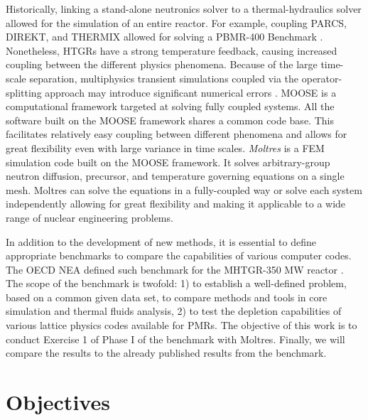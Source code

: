 \documentclass[11pt,letterpaper]{article}
\begin{document}
Historically, linking a stand-alone neutronics solver to a thermal-hydraulics solver allowed for the simulation of an entire reactor.
For example, coupling PARCS, DIREKT, and THERMIX \cite{seker_analysis_2006} allowed for solving a \gls{PBMR}-400 Benchmark \cite{reitsma_oecdneansc_2006}.
Nonetheless, \glspl{HTGR} have a strong temperature feedback, causing increased coupling between the different physics phenomena.
Because of the large time-scale separation, multiphysics transient simulations coupled via the operator-splitting approach may introduce significant numerical errors \cite{ragusa_consistent_2009} \cite{park_tightly_2010}.
\gls{MOOSE} \cite{gaston_moose_2009} \cite{gaston_physics-based_2015} is a computational framework targeted at solving fully coupled systems.
All the software built on the \gls{MOOSE} framework shares a common code base.
This facilitates relatively easy coupling \cite{novak_pronghorn_2018} between different phenomena and allows for great flexibility even with large variance in time scales.
\textit{Moltres} \cite{lindsay_introduction_2018} is a \gls{FEM} simulation code built on the \gls{MOOSE} framework.
It solves arbitrary-group neutron diffusion, precursor, and temperature governing equations on a single mesh.
Moltres can solve the equations in a fully-coupled way or solve each system independently allowing for great flexibility and making it applicable to a wide range of nuclear engineering problems.

In addition to the development of new methods, it is essential to define appropriate benchmarks to compare the capabilities of various computer codes.
The \gls{OECD} \gls{NEA} defined such benchmark for the \gls{MHTGR}-350 MW reactor \cite{oecd_nea_benchmark_2017}.
The scope of the benchmark is twofold: 1) to establish a well-defined problem, based on a common given data set, to compare methods and tools in core simulation and thermal fluids analysis, 2) to test the depletion capabilities of various lattice physics codes available for \glspl{PMR}.
The objective of this work is to conduct Exercise 1 of Phase I of the benchmark with Moltres.
Finally, we will compare the results to the already published results from the benchmark.

\section{Objectives}

\pagebreak


\end{document}
